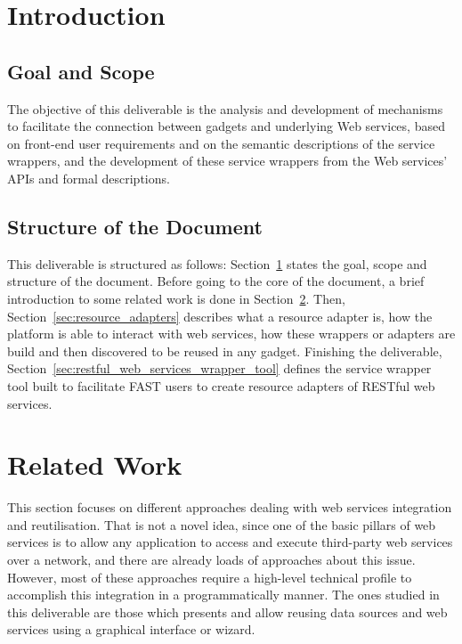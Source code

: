 \documentclass{fast_latex}
\begin{document}
\clearpage
{}

\section{Introduction} %
\label{sec:introduction}

\subsection{Goal and Scope} %
\label{sub:goal_and_scope}

The objective of this deliverable is the analysis and development of mechanisms to facilitate the connection between gadgets and underlying Web services, based on front-end user requirements and on the semantic descriptions of the service wrappers, and the development of these service wrappers from the Web services' APIs and formal descriptions.


\subsection{Structure of the Document} %
\label{sub:structure_of_the_document}

This deliverable is structured as follows: Section~\ref{sec:introduction} states the goal, scope and structure of the document. Before going to the core of the document, a brief introduction to some related work is done in Section~\ref{sec:related_work}. Then, Section~\ref{sec:resource_adapters} describes what a resource adapter is, how the platform is able to interact with web services, how these wrappers or adapters are build and then discovered to be reused in any gadget. Finishing the deliverable, Section~\ref{sec:restful_web_services_wrapper_tool} defines the service wrapper tool built to facilitate FAST users to create resource adapters of RESTful web services.



\clearpage
\section{Related Work} %
\label{sec:related_work}

This section focuses on different approaches dealing with web services integration and reutilisation. That is not a novel idea, since one of the basic pillars of web services is to allow any application to access and execute third-party web services over a network, and there are already loads of approaches about this issue. However, most of these approaches require a high-level technical profile to accomplish this integration in a programmatically manner. The ones studied in this deliverable are those which presents and allow reusing data sources and web services using a graphical interface or wizard.
\end{document}
